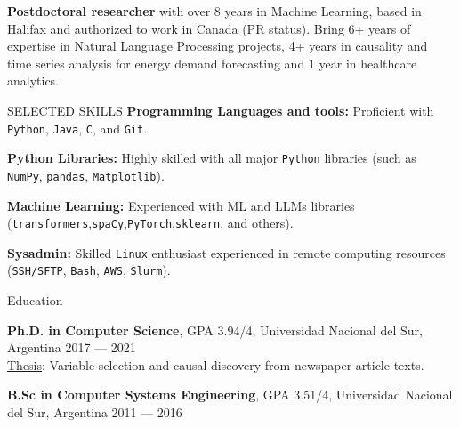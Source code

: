 \documentclass{resume} %
\begin{document}
\vspace{-0.3cm}
\begin{rSection}{}
\textbf{Postdoctoral researcher} with over 8 years in Machine Learning, based in Halifax and authorized to work in Canada (PR status). Bring 6+ years of expertise in Natural Language Processing projects, 4+ years in causality and time series analysis for energy demand forecasting and 1 year in healthcare analytics.

\end{rSection}





\vspace{-0.2cm}
\begin{rSection}{SELECTED SKILLS}
\textbf{Programming Languages and tools:} Proficient with \texttt{Python}, \texttt{Java}, \texttt{C}, and \texttt{Git}.
\vspace{-0.25cm}

\textbf{Python Libraries:} Highly skilled with all major \texttt{Python} libraries (such as \texttt{NumPy}, \texttt{pandas}, \texttt{Matplotlib}).
\vspace{-0.25cm}

\textbf{Machine Learning:} Experienced with ML and LLMs libraries (\texttt{transformers},\texttt{spaCy},\texttt{PyTorch},\texttt{sklearn}, and others).
\vspace{-0.75cm}

\textbf{Sysadmin:} Skilled \texttt{Linux} enthusiast experienced in remote computing resources (\texttt{SSH/SFTP}, \texttt{Bash}, \texttt{AWS}, \texttt{Slurm}).
\end{rSection}

\vspace{-0.3cm}
\begin{rSection}{Education}

{\bf Ph.D. in Computer Science}, GPA 3.94/4, Universidad Nacional del Sur, Argentina \hfill {2017 --- 2021}\\
\underline{Thesis}: Variable selection and causal discovery from  newspaper article texts.\\

\vspace{-0.6cm}


{\bf B.Sc in Computer Systems Engineering}, GPA 3.51/4, Universidad Nacional del Sur, Argentina \hfill {2011 --- 2016}\\
\vspace{-0.2cm}


\end{rSection}
\end{document}
